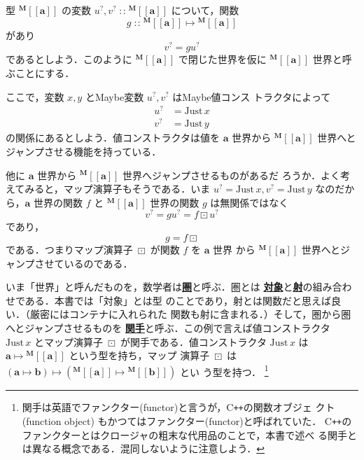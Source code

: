 \documentclass[a5paper,twoside,fleqn,draft]{jsbook}
\def\[{[\![}
\def\]{]\!]}
\newcommand{\programminglanguage}[1]{\textsf{#1}}
\newcommand{\cxx}{\programminglanguage{C}\texttt{++}}
\newcommand{\keyword}[1]{{\underline{\textbf{#1}}}}
\DeclareMathOperator{\mIn}{{:\!:}}
\DeclareMathOperator{\mMapMaybe}{\boxdot}
\DeclareMathOperator{\mMapsTo}{\mapsto}
\newcommand{\mType}[1]{\mathbf{#1}} %
\newcommand{\mA}{\mType{a}}
\newcommand{\mB}{\mType{b}}
\newcommand{\mTypeAssemble}[2]{{}^\mType{#1}\[\mType{#2}\]}
\newcommand{\mMaybeType}[1]{\mTypeAssemble{M}{#1}}
\newcommand{\mValueConstructor}[1]{\mathrm{#1}}
\newcommand{\mValueWith}[2]{\mValueConstructor{#1}\,#2}
\newcommand{\mJustWith}[1]{\mValueWith{Just}{#1}}
\newcommand{\mMaybe}[1]{{#1}^?}
\begin{document}
型 $\mMaybeType{a}$ の変数 $\mMaybe{u},\mMaybe{v}\mIn\mMaybeType{a}$
について，関数
\begin{equation}
  g
  \mIn\mMaybeType{a}\mMapsTo\mMaybeType{a}
\end{equation}
があり
\begin{equation}
  \mMaybe{v}
  =g\mMaybe{u}
\end{equation}
であるとしよう．このように $\mMaybeType{a}$ で閉じた世界を仮に
$\mMaybeType{a}$ 世界と呼ぶことにする．

ここで，変数 $x,y$ とMaybe変数 $\mMaybe{u},\mMaybe{v}$ はMaybe値コンス
トラクタによって
\begin{align}
  \mMaybe{u}
  &=\mJustWith{x}\\
  \mMaybe{v}
  &=\mJustWith{y}
\end{align}
の関係にあるとしよう．値コンストラクタは値を $\mA$ 世界から
$\mMaybeType{a}$ 世界へとジャンプさせる機能を持っている．

他に $\mA$ 世界から $\mMaybeType{a}$ 世界へジャンプさせるものがあるだ
ろうか．よく考えてみると，マップ演算子もそうである．いま
$\mMaybe{u}=\mJustWith{x},\mMaybe{v}=\mJustWith{y}$ なのだから，$\mA $
世界の関数 $f$ と $\mMaybeType{a}$ 世界の関数 $g$ は無関係ではなく
\begin{equation}
  \mMaybe{v}
  =g\mMaybe{u}
  =f\mMapMaybe\mMaybe{u}
\end{equation}
であり，
\begin{equation}
  g
  =f\mMapMaybe
\end{equation}
である．つまりマップ演算子 $\mMapMaybe$ が関数 $f$ を $\mA$ 世界
から $\mMaybeType{a}$ 世界へとジャンプさせているのである．

いま「世界」と呼んだものを，数学者は\keyword{圏}と呼ぶ．圏とは
\keyword{対象}と\keyword{射}の組み合わせである．本書では「対象」とは型
のことであり，射とは関数だと思えば良い．（厳密にはコンテナに入れられた
  関数も射に含まれる．）そして，圏から圏へとジャンプさせるものを
\keyword{関手}と呼ぶ．この例で言えば値コンストラクタ $\mJustWith{x}$
とマップ演算子 $\mMapMaybe$ が関手である．値コンストラクタ
$\mJustWith{x}$ は $\mA\mMapsTo\mMaybeType{a}$ という型を持ち，マップ
演算子 $\mMapMaybe$ は
$(\mA\mMapsTo\mB)\mMapsTo(\mMaybeType{a}\mMapsTo\mMaybeType{b})$ とい
う型を持つ．
\footnote{関手は英語でファンクター(functor)と言うが，\cxx の関数オブジェ
  クト (function object) もかつてはファンクター(functor)と呼ばれていた．
  \cxx のファンクターとはクロージャの粗末な代用品のことで，本書で述べ
  る関手とは異なる概念である．混同しないように注意しよう．}
\end{document}

